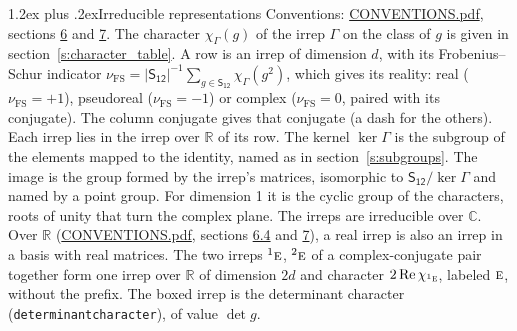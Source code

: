 \documentclass[10pt,a4paper]{article}
\makeatletter
\renewcommand\section{\@startsection{section}{1}{\z@}{-3ex plus -1ex minus -.2ex}%
  {1.2ex plus .2ex}{\normalfont\large\sffamily\bfseries\color{parttitle}}}
\numberwithin{equation}{section}
\newcommand{\grp}[1]{\mathsf{#1}}
\newcommand{\irr}[1]{\text{\normalfont\scshape #1}}
\newcommand{\conjpair}[1]{{}^{#1}}
\newcommand{\irchar}[1]{\chi_{#1}}
\newcommand{\fsind}{\nu_{\mathrm{FS}}}
\makeatother
\begin{document}
\section{Irreducible representations}\label{s:irreps}
Conventions: \href{../../CONVENTIONS.pdf}{CONVENTIONS.pdf}, sections \href{../../CONVENTIONS.pdf\#conv.6}{6} and \href{../../CONVENTIONS.pdf\#conv.7}{7}.
\leavevmode\label{n:function.character}\label{n:irrep.Gamma}The character $\irchar{\Gamma}(g)$ of the irrep $\Gamma$ on the class of $g$ is given in section~\ref{s:character_table}.
\leavevmode\label{n:index.dimension}\label{n:index.frobenius}\label{n:head.irrep}\label{n:head.reality}A row is an irrep of dimension $d$, with its Frobenius--Schur indicator $\fsind = |\grp{S_{12}}|^{-1}\allowbreak\sum_{g\in\grp{S_{12}}}\irchar{\Gamma}(g^2)$, which gives its reality: real ($\fsind = +1$), pseudoreal ($\fsind = -1$) or complex ($\fsind = 0$, paired with its conjugate). \label{n:head.conjugate}The column conjugate gives that conjugate (a dash for the others). \label{n:head.over.real}Each irrep lies in the irrep over $\mathbb{R}$ of its row. \label{n:head.kernel}The kernel $\ker\Gamma$ is the subgroup of the elements mapped to the identity, named as in section~\ref{s:subgroups}. \label{n:head.image}The image is the group formed by the irrep's matrices, isomorphic to $\grp{S_{12}}/\ker\Gamma$ and named by a point group. For dimension 1 it is the cyclic group of the characters, roots of unity that turn the complex plane. The irreps are irreducible over $\mathbb{C}$. Over $\mathbb{R}$ (\href{../../CONVENTIONS.pdf}{CONVENTIONS.pdf}, sections \href{../../CONVENTIONS.pdf\#conv.6.4}{6.4} and \href{../../CONVENTIONS.pdf\#conv.7}{7}), a real irrep is also an irrep in a basis with real matrices. The two irreps $\conjpair{1}\irr{e}$, $\conjpair{2}\irr{e}$ of a complex-conjugate pair together form one irrep over $\mathbb{R}$ of dimension $2d$ and character $2\operatorname{Re}\irchar{\conjpair{1}\irr{e}}$, labeled $\irr{e}$, without the prefix. \label{n:mark.determinant}The boxed irrep is the determinant character (\texttt{determinantcharacter}), of value $\det g$.
\setlength{\emergencystretch}{2em}\par\setlength{\emergencystretch}{0pt}
\end{document}
